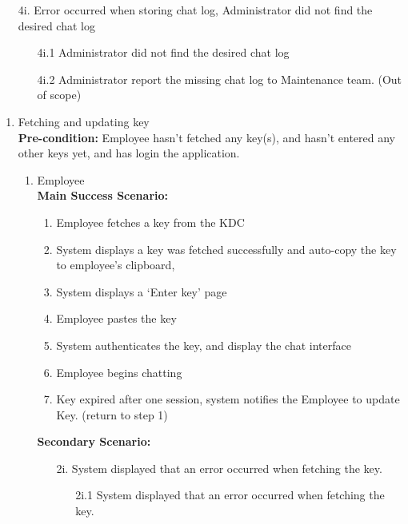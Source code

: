 \documentclass[]{article}
\begin{document}
\begin{enumerate}[{\bf BE1.}]
\begin{enumerate}[{\bf BE8.}]
\begin{enumerate}
                    \item[4i.] Error occurred when storing chat log, Administrator did not find the desired chat log 
                    \begin{enumerate}
                        \item[4i.1] Administrator did not find the desired chat log 
                        \item[4i.2] Administrator report the missing chat log to Maintenance team. (Out of scope)
                    \end{enumerate}
                \end{enumerate}
\end{enumerate}

\begin{enumerate}[{\bf BE9.}]
	\item Fetching and updating key \\
        \textbf{Pre-condition:} Employee hasn’t fetched any key(s), and hasn’t entered any other keys yet, and has login the application.   
		\begin{enumerate}[{\bf VP1.}]
			\item Employee \\
   				\textbf{Main Success Scenario:}
                \begin{enumerate}[{  1.}]
                    \item Employee fetches a key from the KDC 
		    \item System displays a key was fetched successfully and auto-copy the key to employee’s clipboard,  
		    \item System displays a ‘Enter key’ page  
		    \item Employee pastes the key 
                    \item System authenticates the key, and display the chat interface 
		    \item Employee begins chatting 
                    \item Key expired after one session, system notifies the Employee to update Key. (return to step 1)  
                \end{enumerate}
                \textbf{Secondary Scenario:}
                \begin{enumerate}
		    \item[2i.] System displayed that an error occurred when fetching the key.
                    \begin{enumerate}
                        \item[2i.1] System displayed that an error occurred when fetching the key.

\end{enumerate}
\end{enumerate}
\end{enumerate}
\end{enumerate}
\end{enumerate}
\end{document}
